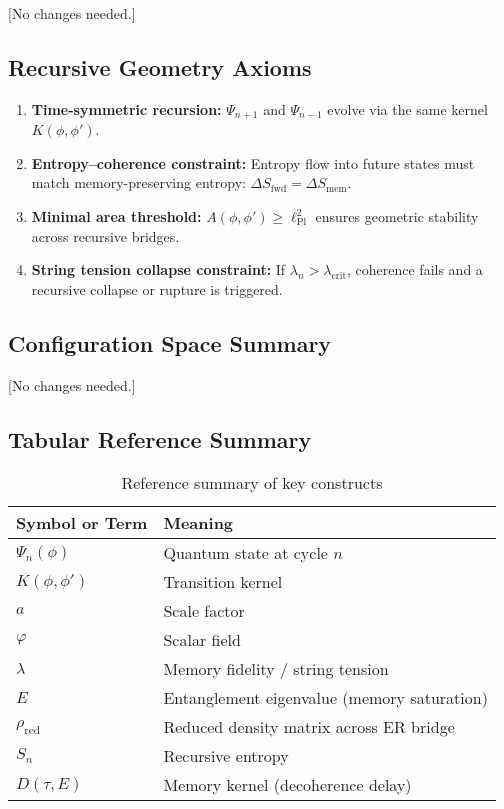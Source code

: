 [No changes needed.]

\subsection{Recursive Geometry Axioms}
\label{subsec:axioms}

\begin{enumerate}
    \item \textbf{Time-symmetric recursion:} \( \Psi_{n+1} \) and \( \Psi_{n-1} \) evolve via the same kernel \( K(\phi, \phi') \).
    \item \textbf{Entropy--coherence constraint:} Entropy flow into future states must match memory-preserving entropy: \( \Delta S_{\text{fwd}} = \Delta S_{\text{mem}} \).
    \item \textbf{Minimal area threshold:} \( A(\phi, \phi') \geq \ell_{\text{Pl}}^2 \) ensures geometric stability across recursive bridges.
    \item \textbf{String tension collapse constraint:} If \( \lambda_n > \lambda_{\text{crit}} \), coherence fails and a recursive collapse or rupture is triggered.
\end{enumerate}

\subsection{Configuration Space Summary}

[No changes needed.]

\subsection{Tabular Reference Summary}
\label{subsec:reference-table}

\begin{table}[H]
\centering
\begin{tabular}{|l|l|}
\hline
\textbf{Symbol or Term} & \textbf{Meaning} \\
\hline
\( \Psi_n(\phi) \) & Quantum state at cycle \( n \) \\
\( K(\phi, \phi') \) & Transition kernel \\
\( a \) & Scale factor \\
\( \varphi \) & Scalar field \\
\( \lambda \) & Memory fidelity / string tension \\
\( E \) & Entanglement eigenvalue (memory saturation) \\
\( \rho_{\text{red}} \) & Reduced density matrix across ER bridge \\
\( S_n \) & Recursive entropy \\
\( D(\tau, E) \) & Memory kernel (decoherence delay) \\
\hline
\end{tabular}
\caption{Reference summary of key constructs}
\end{table}
